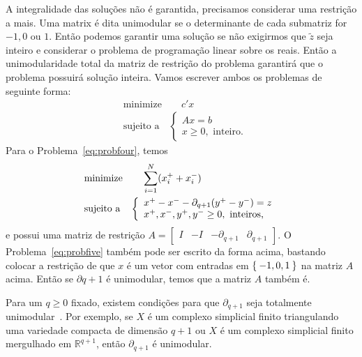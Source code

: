A integralidade das soluções não é garantida, precisamos considerar uma
restrição a mais. Uma matrix é dita unimodular se o determinante de cada
submatriz for $-1, 0$ ou $1$. Então podemos garantir uma solução se 
não exigirmos que $\tilde{z}$ seja inteiro e considerar o problema 
de programação linear sobre os reais. Então a unimodularidade total
da matriz de restrição do problema garantirá que o problema possuirá 
solução inteira. Vamos escrever ambos os problemas de seguinte forma:
\begin{equation*}
    \begin{split}
        &\text{minimize} \quad \quad c'x \\
        &\text{sujeito a} \quad \left \{ \begin{array}{l}
            Ax = b \\
            x \geq 0, \text{ inteiro.}
        \end{array} \right.
    \end{split}
\end{equation*}
Para o Problema~\eqref{eq:probfour}, temos
\begin{equation*}
    \begin{split}
        &\text{minimize} \quad \quad  \sum_{i=1}^N (x^+_i + x^-_i) \\
        &\text{sujeito a} \quad \left \{ \begin{array}{l}
            x^+ - x^- - \partial_{q+1}(y^+ - y^-) = z \\
            x^+, x^-, y^+, y^-  \geq 0, \text{ inteiros,}
        \end{array} \right.
    \end{split}
\end{equation*}
e possui uma matriz de restrição 
$A = \begin{bmatrix}
I & -I & -\partial_{q+1} & \partial_{q+1}
\end{bmatrix}$. O Problema~\eqref{eq:probfive} também pode ser escrito da forma acima,
bastando colocar a restrição de que $x$ é um vetor com entradas em $\Set{-1,0,1}$ na 
matriz $A$ acima. Então se $\partial{q+1}$ é unimodular, temos que a matriz $A$
também é. 

Para um $q \geq 0$ fixado, existem condições para que $\partial_{q+1}$ seja 
totalmente unimodular~\cite{Dey2010}. Por exemplo, se $X$ é um complexo simplicial finito
triangulando uma variedade compacta de dimensão $q+1$ ou $X$ é um complexo simplicial
finito mergulhado em $\mathbb{R}^{q+1}$, então $\partial_{q+1}$ é unimodular.

